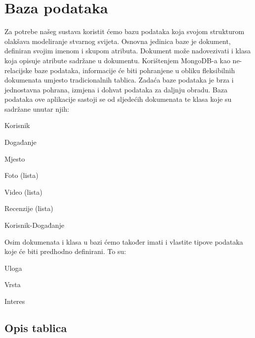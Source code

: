 				
		\section{Baza podataka}
			
			Za potrebe našeg sustava koristit ćemo bazu podataka koja svojom strukturom olakšava modeliranje stvarnog svijeta. Osnovna jedinica baze je dokument, definiran svojim imenom i skupom atributa. Dokument može nadovezivati i klasa koja opisuje atribute sadržane u dokumentu. Korištenjem MongoDB-a kao ne-relacijske baze podataka, informacije će biti pohranjene u obliku fleksibilnih dokumenata umjesto tradicionalnih tablica. Zadaća baze podataka je brza i jednostavna pohrana, izmjena i dohvat podataka za daljnju obradu. Baza podataka ove aplikacije sastoji se od sljedećih dokumenata te klasa koje su sadržane unutar njih:
			\begin{packed_item}
	
						\item Korisnik
						
						\item Događanje
							\begin{packed_item}
							\item Mjesto
							\item Foto (lista)
							\item Video (lista)
							\item Recenzije (lista)
							\end{packed_item}
						
						\item Korisnik-Događanje
						
						
						
			\end{packed_item}
			
			Osim dokumenata i klasa u bazi ćemo također imati i vlastite tipove podataka koje će biti predhodno definirani. To su: 
			\begin{packed_item}
	
						\item Uloga
						\item Vrsta
						\item Interes
			\end{packed_item}
						
				
			\subsection{Opis tablica}
			
